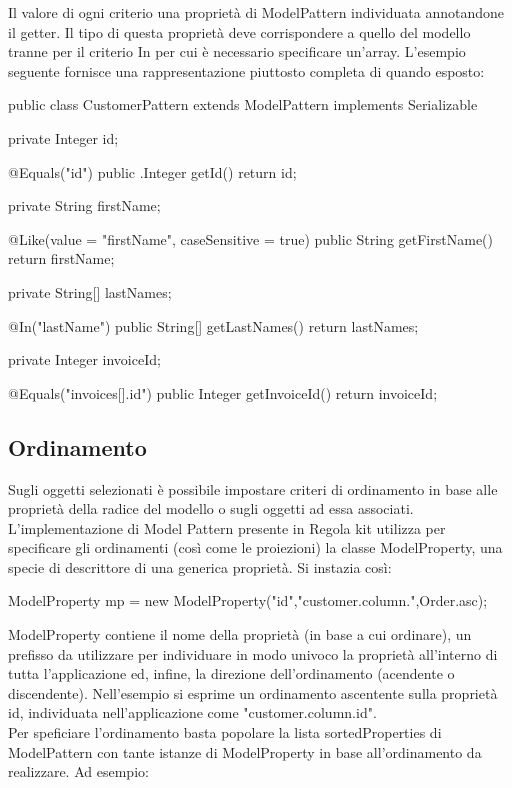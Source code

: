 Il valore di ogni criterio una proprietà di ModelPattern individuata annotandone il getter. Il tipo di questa proprietà deve corrispondere a quello del modello tranne per il criterio In per cui è necessario specificare un'array. L'esempio seguente fornisce una rappresentazione piuttosto completa di quando esposto:

\begin{java}
public class CustomerPattern extends ModelPattern 
   implements Serializable {
  
  private Integer id;

  @Equals("id")
  public .Integer getId()
  {
    return id;
  }
  
  private String firstName;
  
  @Like(value = "firstName", caseSensitive = true)
  public String getFirstName()
  {
    return firstName;
  }
    
  private String[] lastNames;
  
  @In("lastName")
  public String[] getLastNames() {
    return lastNames;
  }

  private Integer invoiceId;
 
  @Equals("invoices[].id")
  public Integer getInvoiceId() {
    return invoiceId;
  }

}
\end{java}

\subsection{Ordinamento}
Sugli oggetti selezionati è possibile impostare criteri di ordinamento in base alle proprietà della radice del modello o sugli oggetti ad essa associati. L'implementazione di Model Pattern presente in Regola kit utilizza per specificare gli ordinamenti (così come le proiezioni) la classe ModelProperty, una specie di descrittore di una generica proprietà. Si instazia così:

\begin{java}
   ModelProperty mp =  new ModelProperty("id","customer.column.",Order.asc);   
\end{java}

ModelProperty contiene il nome della proprietà (in base a cui ordinare), un prefisso da utilizzare per individuare in modo univoco la proprietà all'interno di tutta l'applicazione ed, infine, la direzione dell'ordinamento (acendente o discendente). 
Nell'esempio si esprime un ordinamento ascentente sulla proprietà id, individuata nell'applicazione come "customer.column.id".
\\
Per speficiare l'ordinamento basta popolare la lista sortedProperties di ModelPattern con tante istanze di ModelProperty in base all'ordinamento da realizzare. Ad esempio:

